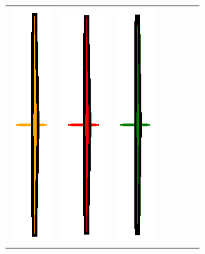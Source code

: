 \begin{table}[!h]
\begin{center}
\begin{tabular}{C{2cm} C{3.8cm} C{1.25cm} C{1.6cm} C{1.6cm} C{1.6cm} C{1.6cm}}
    \includegraphics[trim={10.5cm 1.5cm 10.5cm 1.5cm},clip,scale=0.7]{margins.eps} &
    \includegraphics[trim={10.5cm 1.5cm 10.5cm 1.5cm},clip,scale=0.7]{box.eps} &
    \includegraphics[trim={10.5cm 1.5cm 10.5cm 1.5cm},clip,scale=0.7]{ellipsoidal.eps} \\

\end{tabular}
\end{center}
\end{table}

